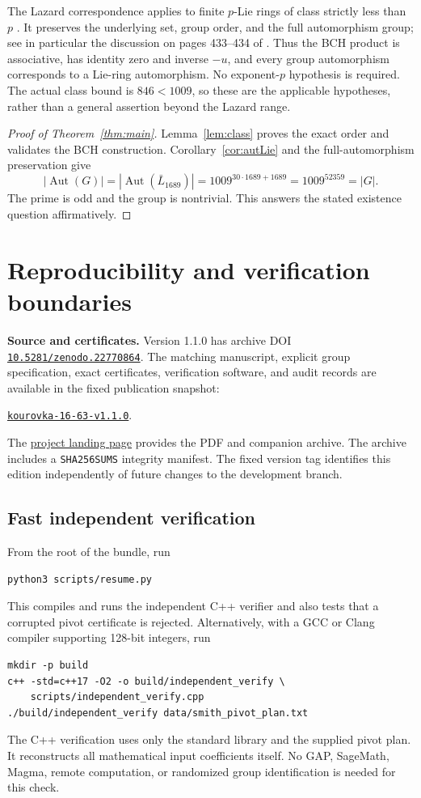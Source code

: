 \documentclass[11pt]{article}
\theoremstyle{definition}\newtheorem{definition}[theorem]{Definition}
\theoremstyle{remark}\newtheorem{remark}[theorem]{Remark}
\DeclareMathOperator{\Aut}{Aut}
\begin{document}
The Lazard correspondence applies to finite $p$-Lie rings of class strictly
less than $p$ \cite{Lazard,CDV}. It preserves the underlying set, group order,
and the full automorphism group; see in particular the discussion on
pages 433--434 of \cite{CDV}. Thus the BCH product is associative, has
identity zero and inverse $-u$, and every group automorphism corresponds
to a Lie-ring automorphism. No exponent-$p$ hypothesis is required.
The actual class bound is $846<1009$, so these are the applicable
hypotheses, rather than a general assertion beyond the Lazard range.

\begin{proof}[Proof of Theorem~\ref{thm:main}]
Lemma~\ref{lem:class} proves the exact order and validates the BCH construction.
Corollary~\ref{cor:autLie} and the full-automorphism preservation give
\[
 |\Aut(G)|=|\Aut(\bar L_{1689})|
 =1009^{30\cdot1689+1689}
 =1009^{52359}=|G|.
\]
The prime is odd and the group is nontrivial. This answers the stated
existence question affirmatively.
\end{proof}

\section{Reproducibility and verification boundaries}\label{sec:reproducibility}
\noindent\textbf{Source and certificates.}
Version 1.1.0 has archive DOI
\href{https://doi.org/10.5281/zenodo.22770864}{\nolinkurl{10.5281/zenodo.22770864}}.
The matching manuscript, explicit group specification, exact certificates,
verification software, and audit records are available in the fixed
publication snapshot:
\begin{center}
\href{https://github.com/AlecKriebel/Math/tree/kourovka-16-63-v1.1.0/kourovka_16_63}{\texttt{kourovka-16-63-v1.1.0}}.
\end{center}
The \href{https://aleckriebel.github.io/Math/papers/kourovka-16-63/}{project landing page}
provides the PDF and companion archive. The archive includes a
\texttt{SHA256SUMS} integrity manifest. The fixed version tag identifies this
edition independently of future changes to the development branch.

\subsection{Fast independent verification}
From the root of the bundle, run
\begin{verbatim}
python3 scripts/resume.py
\end{verbatim}
This compiles and runs the independent C++ verifier and also tests that a
corrupted pivot certificate is rejected. Alternatively, with a GCC or
Clang compiler supporting 128-bit integers, run
\begin{verbatim}
mkdir -p build
c++ -std=c++17 -O2 -o build/independent_verify \
    scripts/independent_verify.cpp
./build/independent_verify data/smith_pivot_plan.txt
\end{verbatim}
The C++ verification uses only the standard library and the supplied
pivot plan. It reconstructs all mathematical input coefficients itself.
No GAP, SageMath, Magma, remote computation, or randomized group
identification is needed for this check.
\end{document}
